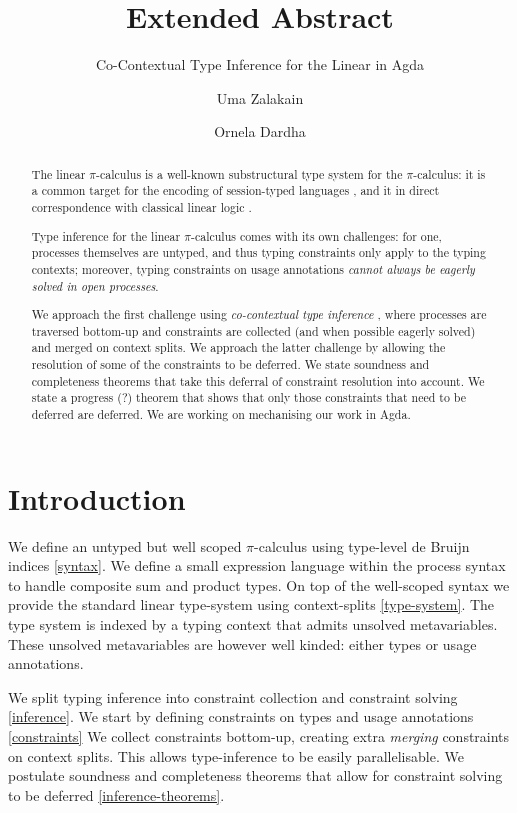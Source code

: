 \documentclass[sigplan,screen,review]{acmart}
\title{Extended Abstract}
\subtitle{Co-Contextual Type Inference for the Linear \Picalc{} in Agda}
\author{Uma Zalakain}
\affiliation{University of Glasgow}
\author{Ornela Dardha}
\affiliation{University of Glasgow}
\newcommand{\picalc}{$\pi$-calculus}
\begin{document}
\begin{abstract}
  The linear \picalc{} is a well-known substructural type system for the \picalc{}:
  it is a common target for the encoding of session-typed languages ,
  and it in direct correspondence with classical linear logic .

  Type inference for the linear \picalc{} comes with its own challenges:
  for one, processes themselves are untyped, and thus typing constraints only apply to the typing contexts;
  moreover, typing constraints on usage annotations \emph{cannot always be eagerly solved in open processes}.

  We approach the first challenge using \emph{co-contextual type inference} \cite{ErdwegBKKM15}, where processes are traversed bottom-up and constraints are collected (and when possible eagerly solved) and merged on context splits.
  We approach the latter challenge by allowing the resolution of some of the constraints to be deferred.
  We state soundness and completeness theorems that take this deferral of constraint resolution into account.
  We state a progress (?) theorem that shows that only those constraints that need to be deferred are deferred.
  We are working on mechanising our work in Agda.
\end{abstract}


\maketitle

\section{Introduction}\label{introduction}

We define an untyped but well scoped \picalc{} using type-level de Bruijn  indices \autoref{syntax}.
We define a small expression language within the process syntax to handle composite sum and product types.
On top of the well-scoped syntax we provide the standard linear type-system using context-splits \autoref{type-system}.
The type system is indexed by a typing context that admits unsolved metavariables.
These unsolved metavariables are however well kinded: either types or usage annotations.


We split typing inference into constraint collection and constraint solving \autoref{inference}.
We start by defining constraints on types and usage annotations \autoref{constraints}
We collect constraints bottom-up, creating extra \emph{merging} constraints on context splits.
This allows type-inference to be easily parallelisable.
We postulate soundness and completeness theorems that allow for constraint solving to be deferred \autoref{inference-theorems}.
\end{document}
